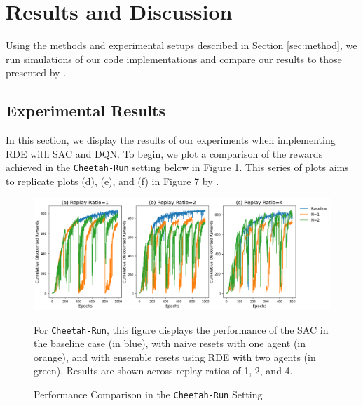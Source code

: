\documentclass[base]{subfiles}
\begin{document}
\section{Results and Discussion}
\label{sec:results}

Using the methods and experimental setups described in Section \ref{sec:method}, we run simulations of our code implementations and compare our results to those presented by \cite{kim2023}.

\subsection{Experimental Results}
\label{ssec:experiments}

In this section, we display the results of our experiments when implementing RDE with SAC and DQN. 
To begin, we plot a comparison of the rewards achieved in the \texttt{Cheetah-Run} setting below in Figure \ref{fig:cheetah}. This series of plots aims to replicate plots (d), (e), and (f) in Figure 7 by \cite{kim2023}. 

\begin{figure}[h!]
    \centering
    \caption{Performance Comparison in the \texttt{Cheetah-Run} Setting}
    \label{fig:cheetah}
    \includegraphics[width = 1 \linewidth]{cheetah_fig.png}
    \begin{flushleft} For \texttt{Cheetah-Run}, this figure displays the performance of the SAC in the baseline case (in blue), with naive resets with one agent (in orange), and with ensemble resets using RDE with two agents (in green). Results are shown across replay ratios of 1, 2, and 4. \end{flushleft}
\end{figure}
\end{document}
